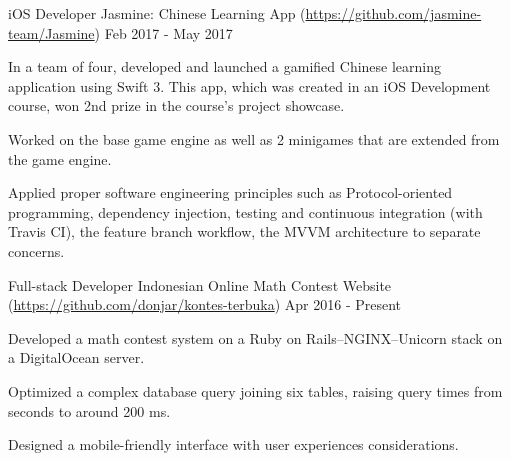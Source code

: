 

\begin{cventries}

  \cventry
  {iOS Developer} %
  {Jasmine: Chinese Learning App (\url{https://github.com/jasmine-team/Jasmine})} %
  {} %
  {Feb 2017 - May 2017} %
  {
    \begin{cvitems} %
    \item {In a team of four, developed and launched a gamified Chinese learning application using Swift 3. This app, which was created in an iOS Development course, won 2nd prize in the course's project showcase.}
    \item {Worked on the base game engine as well as 2 minigames that are extended from the game engine.}
    \item {Applied proper software engineering principles such as Protocol-oriented programming, dependency injection, testing and continuous integration (with Travis CI), the feature branch workflow, the MVVM architecture to separate concerns.}
    \end{cvitems}
  }


  \cventry
  {Full-stack Developer} %
  {Indonesian Online Math Contest Website (\url{https://github.com/donjar/kontes-terbuka})} %
  {} %
  {Apr 2016 - Present} %
  {
    \begin{cvitems} %
    \item {Developed a math contest system on a Ruby on Rails--NGINX--Unicorn stack on a DigitalOcean server.}
    \item {Optimized a complex database query joining six tables, raising query times from seconds to around 200 ms.}
    \item {Designed a mobile-friendly interface with user experiences considerations.}
    \end{cvitems}
  }

\end{cventries}
